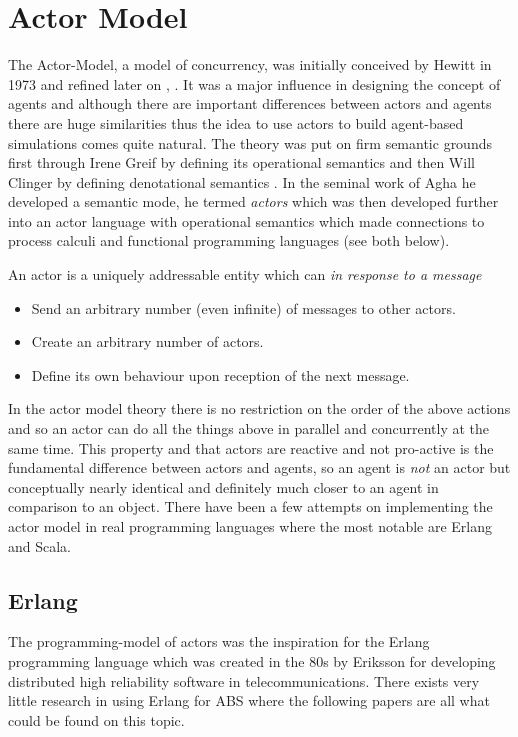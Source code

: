 \section{Actor Model}
The Actor-Model, a model of concurrency, was initially conceived by Hewitt in 1973 \cite{hewitt_universal_1973} and refined later on \cite{hewitt_what_2007}, \cite{hewitt_actor_2010}. It was a major influence in designing the concept of agents and although there are important differences between actors and agents there are huge similarities thus the idea to use actors to build agent-based simulations comes quite natural. The theory was put on firm semantic grounds first through Irene Greif by defining its operational semantics \cite{grief_semantics_1975} and then Will Clinger by defining denotational semantics \cite{clinger_foundations_1981}. In the seminal work of Agha \cite{agha_actors:_1986} he developed a semantic mode, he termed \textit{actors} which was then developed further \cite{agha_foundation_1997} into an actor language with operational semantics which made connections to process calculi and functional programming languages (see both below). 

An actor is a uniquely addressable entity which can \textit{in response to a message}
\begin{itemize}
	\item Send an arbitrary number (even infinite) of messages to other actors.
	\item Create an arbitrary number of actors.
	\item Define its own behaviour upon reception of the next message.
\end{itemize}

In the actor model theory there is no restriction on the order of the above actions and so an actor can do all the things above in parallel and concurrently at the same time. This property and that actors are reactive and not pro-active is the fundamental difference between actors and agents, so an agent is \textit{not} an actor but conceptually nearly identical and definitely much closer to an agent in comparison to an object. There have been a few attempts on implementing the actor model in real programming languages where the most notable are Erlang and Scala.

\subsection{Erlang}
The programming-model of actors \cite{agha_actors:_1986} was the inspiration for the Erlang programming language which was created in the 80s by Eriksson \cite{armstrong_erlang_2010} for developing distributed high reliability software in telecommunications. There exists very little research in using Erlang for ABS where the following papers are all what could be found on this topic.

